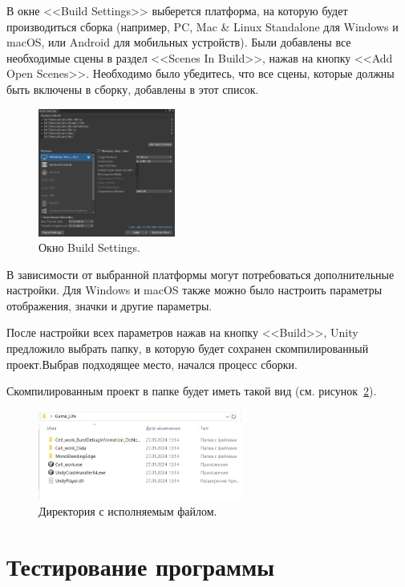 В окне <<Build Settings>> выберется платформа, на которую будет производиться сборка (например, PC, Mac \& Linux Standalone для Windows и macOS, или Android для мобильных устройств). Были добавлены все необходимые сцены в раздел <<Scenes In Build>>, нажав на кнопку <<Add Open Scenes>>. Необходимо было убедитесь, что все сцены, которые должны быть включены в сборку, добавлены в этот список.

\begin{figure}[H]
	\centering
	\includegraphics[width=0.4\textwidth]{images/build2.png}  
	\caption{Окно Build Settings.}
	\label{fig5}
\end{figure}

В зависимости от выбранной платформы могут потребоваться дополнительные настройки. Для Windows и macOS также можно было настроить параметры отображения, значки и другие параметры.

После настройки всех параметров нажав на кнопку <<Build>>, Unity предложило выбрать папку, в которую будет сохранен скомпилированный проект.Выбрав подходящее место, начался процесс сборки.

Скомпилированным проект в папке будет иметь такой вид (см. рисунок~\ref{fig6}). 
\begin{figure}[H]
	\centering
	\includegraphics[width=0.6\textwidth]{images/dir.png}  
	\caption{Директория с исполняемым файлом.}
	\label{fig6}
\end{figure}

\section{\label{sec:ch02/sec01/sub06}Тестирование программы}

